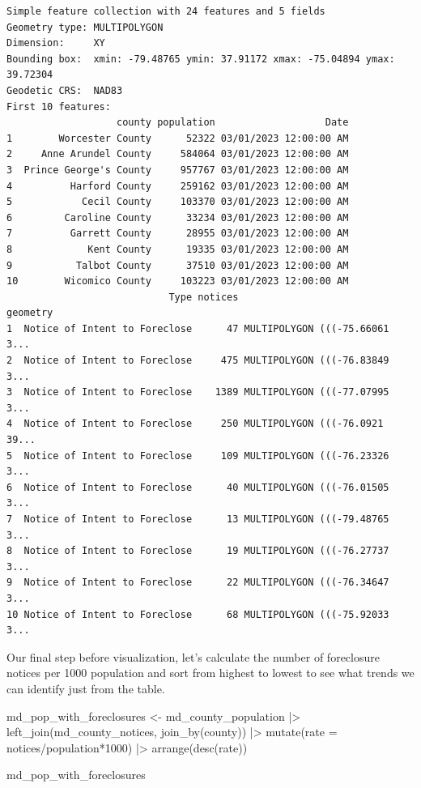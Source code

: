 \documentclass[
  letterpaper,
  DIV=11,
  numbers=noendperiod]{scrreprt}
\newenvironment{Shaded}{\begin{snugshade}}{\end{snugshade}}
\newcommand{\AttributeTok}[1]{\textcolor[rgb]{0.40,0.45,0.13}{#1}}
\newcommand{\DecValTok}[1]{\textcolor[rgb]{0.68,0.00,0.00}{#1}}
\newcommand{\FunctionTok}[1]{\textcolor[rgb]{0.28,0.35,0.67}{#1}}
\newcommand{\NormalTok}[1]{\textcolor[rgb]{0.00,0.23,0.31}{#1}}
\newcommand{\OtherTok}[1]{\textcolor[rgb]{0.00,0.23,0.31}{#1}}
\newcommand{\SpecialCharTok}[1]{\textcolor[rgb]{0.37,0.37,0.37}{#1}}
\begin{document}
\begin{verbatim}
Simple feature collection with 24 features and 5 fields
Geometry type: MULTIPOLYGON
Dimension:     XY
Bounding box:  xmin: -79.48765 ymin: 37.91172 xmax: -75.04894 ymax: 39.72304
Geodetic CRS:  NAD83
First 10 features:
                   county population                   Date
1        Worcester County      52322 03/01/2023 12:00:00 AM
2     Anne Arundel County     584064 03/01/2023 12:00:00 AM
3  Prince George's County     957767 03/01/2023 12:00:00 AM
4          Harford County     259162 03/01/2023 12:00:00 AM
5            Cecil County     103370 03/01/2023 12:00:00 AM
6         Caroline County      33234 03/01/2023 12:00:00 AM
7          Garrett County      28955 03/01/2023 12:00:00 AM
8             Kent County      19335 03/01/2023 12:00:00 AM
9           Talbot County      37510 03/01/2023 12:00:00 AM
10        Wicomico County     103223 03/01/2023 12:00:00 AM
                            Type notices                       geometry
1  Notice of Intent to Foreclose      47 MULTIPOLYGON (((-75.66061 3...
2  Notice of Intent to Foreclose     475 MULTIPOLYGON (((-76.83849 3...
3  Notice of Intent to Foreclose    1389 MULTIPOLYGON (((-77.07995 3...
4  Notice of Intent to Foreclose     250 MULTIPOLYGON (((-76.0921 39...
5  Notice of Intent to Foreclose     109 MULTIPOLYGON (((-76.23326 3...
6  Notice of Intent to Foreclose      40 MULTIPOLYGON (((-76.01505 3...
7  Notice of Intent to Foreclose      13 MULTIPOLYGON (((-79.48765 3...
8  Notice of Intent to Foreclose      19 MULTIPOLYGON (((-76.27737 3...
9  Notice of Intent to Foreclose      22 MULTIPOLYGON (((-76.34647 3...
10 Notice of Intent to Foreclose      68 MULTIPOLYGON (((-75.92033 3...
\end{verbatim}

Our final step before visualization, let's calculate the number of
foreclosure notices per 1000 population and sort from highest to lowest
to see what trends we can identify just from the table.

\begin{Shaded}
\begin{Highlighting}[]
\NormalTok{md\_pop\_with\_foreclosures }\OtherTok{\textless{}{-}}\NormalTok{ md\_county\_population }\SpecialCharTok{|\textgreater{}}
  \FunctionTok{left\_join}\NormalTok{(md\_county\_notices, }\FunctionTok{join\_by}\NormalTok{(county)) }\SpecialCharTok{|\textgreater{}} 
  \FunctionTok{mutate}\NormalTok{(}\AttributeTok{rate =}\NormalTok{ notices}\SpecialCharTok{/}\NormalTok{population}\SpecialCharTok{*}\DecValTok{1000}\NormalTok{) }\SpecialCharTok{|\textgreater{}}
  \FunctionTok{arrange}\NormalTok{(}\FunctionTok{desc}\NormalTok{(rate))}

\NormalTok{md\_pop\_with\_foreclosures}
\end{Highlighting}
\end{Shaded}
\end{document}

